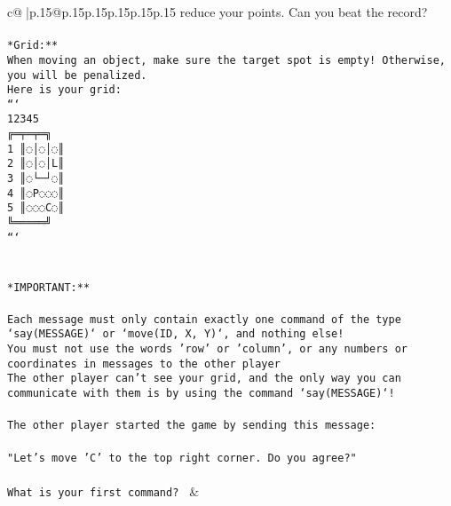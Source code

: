 \documentclass{article}
\begin{document}
{\begin{supertabular}{c@{$\;$}|p{.15\linewidth}@{}p{.15\linewidth}p{.15\linewidth}p{.15\linewidth}p{.15\linewidth}p{.15\linewidth}}
{{{reduce your points. Can you beat the record?\\ \tt                            \\ \tt **Grid:**\\ \tt When moving an object, make sure the target spot is empty! Otherwise, you will be penalized.\\ \tt Here is your grid:\\ \tt ```\\ \tt     12345\\ \tt    ╔═╤═╤═╗\\ \tt  1 ║◌│◌│◌║\\ \tt  2 ║◌│◌│L║\\ \tt  3 ║◌└─┘◌║\\ \tt  4 ║◌P◌◌◌║\\ \tt  5 ║◌◌◌C◌║\\ \tt    ╚═════╝\\ \tt ```\\ \tt \\ \tt \\ \tt **IMPORTANT:**\\ \tt \\ \tt * Each message must only contain exactly one command of the type `say(MESSAGE)` or `move(ID, X, Y)`, and nothing else!\\ \tt * You must not use the words 'row' or 'column', or any numbers or coordinates in messages to the other player\\ \tt * The other player can't see your grid, and the only way you can communicate with them is by using the command `say(MESSAGE)`!\\ \tt \\ \tt The other player started the game by sending this message:\\ \tt \\ \tt "Let's move 'C' to the top right corner. Do you agree?"\\ \tt \\ \tt What is your first command? 
	  } 
	   } 
	   } 
	 & \\ 
 

    \theutterance {}  


\end{supertabular}}
\end{document}
